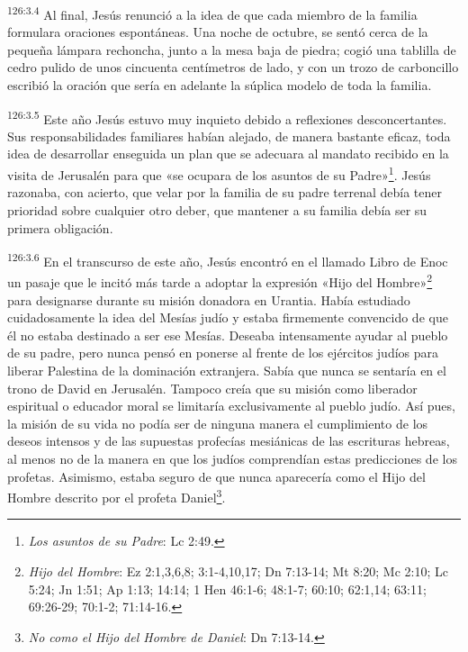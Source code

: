 \par
\textsuperscript{126:3.4} Al final, Jesús renunció a la idea de que cada miembro de la familia formulara oraciones espontáneas. Una noche de octubre, se sentó cerca de la pequeña lámpara rechoncha, junto a la mesa baja de piedra; cogió una tablilla de cedro pulido de unos cincuenta centímetros de lado, y con un trozo de carboncillo escribió la oración que sería en adelante la súplica modelo de toda la familia.

\par
\textsuperscript{126:3.5} Este año Jesús estuvo muy inquieto debido a reflexiones desconcertantes. Sus responsabilidades familiares habían alejado, de manera bastante eficaz, toda idea de desarrollar enseguida un plan que se adecuara al mandato recibido en la visita de Jerusalén para que «se ocupara de los asuntos de su Padre»\footnote{\textit{Los asuntos de su Padre}: Lc 2:49.}. Jesús razonaba, con acierto, que velar por la familia de su padre terrenal debía tener prioridad sobre cualquier otro deber, que mantener a su familia debía ser su primera obligación.

\par
\textsuperscript{126:3.6} En el transcurso de este año, Jesús encontró en el llamado Libro de Enoc un pasaje que le incitó más tarde a adoptar la expresión «Hijo del Hombre»\footnote{\textit{Hijo del Hombre}: Ez 2:1,3,6,8; 3:1-4,10,17; Dn 7:13-14; Mt 8:20; Mc 2:10; Lc 5:24; Jn 1:51; Ap 1:13; 14:14; 1 Hen 46:1-6; 48:1-7; 60:10; 62:1,14; 63:11; 69:26-29; 70:1-2; 71:14-16.} para designarse durante su misión donadora en Urantia. Había estudiado cuidadosamente la idea del Mesías judío y estaba firmemente convencido de que él no estaba destinado a ser ese Mesías. Deseaba intensamente ayudar al pueblo de su padre, pero nunca pensó en ponerse al frente de los ejércitos judíos para liberar Palestina de la dominación extranjera. Sabía que nunca se sentaría en el trono de David en Jerusalén. Tampoco creía que su misión como liberador espiritual o educador moral se limitaría exclusivamente al pueblo judío. Así pues, la misión de su vida no podía ser de ninguna manera el cumplimiento de los deseos intensos y de las supuestas profecías mesiánicas de las escrituras hebreas, al menos no de la manera en que los judíos comprendían estas predicciones de los profetas. Asimismo, estaba seguro de que nunca aparecería como el Hijo del Hombre descrito por el profeta Daniel\footnote{\textit{No como el Hijo del Hombre de Daniel}: Dn 7:13-14.}.

